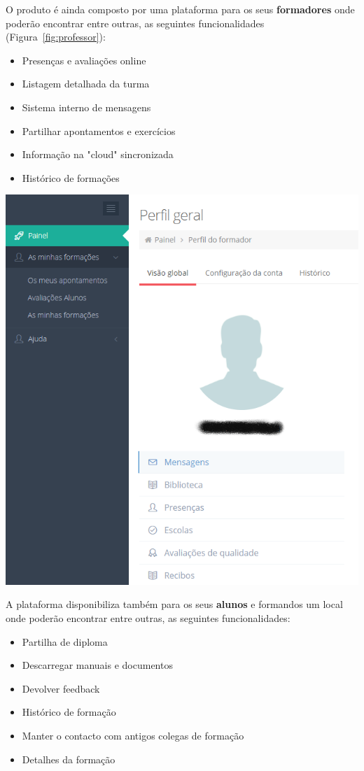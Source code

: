O produto é ainda composto por uma plataforma para os seus \textbf{formadores} onde poderão encontrar entre outras, as seguintes funcionalidades (Figura~\ref{fig:professor}):
\begin{itemize}
  \setlength\itemsep{0em}
  \item Presenças e avaliações online
  \item Listagem detalhada da turma
  \item Sistema interno de mensagens
  \item Partilhar apontamentos e exercícios
  \item Informação na "cloud" sincronizada
  \item Histórico de formações
\end{itemize}

\begin{center}
        \includegraphics[width=\textwidth,height=\textheight,keepaspectratio]{images/professor.png}
        \label{fig:professor}
\end{center}

A plataforma disponibiliza também para os seus \textbf{alunos} e formandos um local onde poderão encontrar entre outras, as seguintes funcionalidades:
\begin{itemize}
  \item Partilha de diploma
  \item Descarregar manuais e documentos
  \item Devolver feedback
  \item Histórico de formação
  \item Manter o contacto com antigos colegas de formação
  \item Detalhes da formação
\end{itemize}

